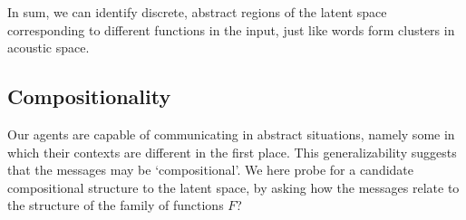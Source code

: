 \documentclass[11pt,a4paper]{article}
\DeclareMathOperator*{\argmax}{arg\,max}
\DeclareMathOperator*{\argmin}{arg\,min}
\begin{document}

In sum, we can identify discrete, abstract regions of the latent space corresponding to different functions in the input, just like words form clusters in acoustic space. 







\subsection{Compositionality}

Our agents are capable of communicating in abstract situations, namely some in which their contexts are different in the first place. This generalizability suggests that the messages may be `compositional'. We here probe for a candidate compositional structure to the latent space, by asking how the messages relate to the structure of the family of functions $F$? 
\end{document}
